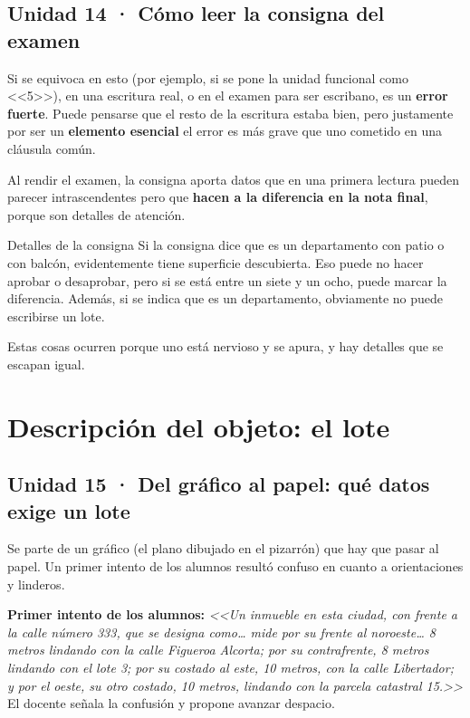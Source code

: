 \documentclass[12pt,oneside]{book}
\begin{document}
\section{Unidad 14 · Cómo leer la consigna del examen}

Si se equivoca en esto (por ejemplo, si se pone la unidad funcional como <<5>>), en una escritura real, o en el examen para ser escribano, es un \textbf{error fuerte}. Puede pensarse que el resto de la escritura estaba bien, pero justamente por ser un \textbf{elemento esencial} el error es más grave que uno cometido en una cláusula común.

Al rendir el examen, la consigna aporta datos que en una primera lectura pueden parecer intrascendentes pero que \textbf{hacen a la diferencia en la nota final}, porque son detalles de atención.

\begin{example}{Detalles de la consigna}
Si la consigna dice que es un departamento con patio o con balcón, evidentemente tiene superficie descubierta. Eso puede no hacer aprobar o desaprobar, pero si se está entre un siete y un ocho, puede marcar la diferencia. Además, si se indica que es un departamento, obviamente no puede escribirse un lote.
\end{example}

Estas cosas ocurren porque uno está nervioso y se apura, y hay detalles que se escapan igual.

\chapter{Descripción del objeto: el lote}

\section{Unidad 15 · Del gráfico al papel: qué datos exige un lote}

Se parte de un gráfico (el plano dibujado en el pizarrón) que hay que pasar al papel. Un primer intento de los alumnos resultó confuso en cuanto a orientaciones y linderos.

\begin{note}
\textbf{Primer intento de los alumnos:} \textit{<<Un inmueble en esta ciudad, con frente a la calle número 333, que se designa como\ldots{} mide por su frente al noroeste\ldots{} 8 metros lindando con la calle Figueroa Alcorta; por su contrafrente, 8 metros lindando con el lote 3; por su costado al este, 10 metros, con la calle Libertador; y por el oeste, su otro costado, 10 metros, lindando con la parcela catastral 15.>>} El docente señala la confusión y propone avanzar despacio.
\end{note}
\end{document}
